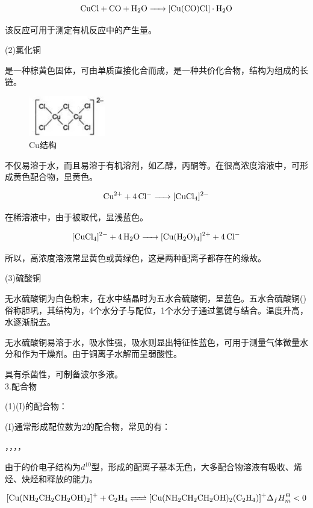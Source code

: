 \documentclass[a4paper,UTF8]{article}
\begin{document}
$$ \ce{CuCl + CO + H2O -> [Cu(CO)Cl]\cdot H2O} $$

该反应可用于测定有机反应中的产生量。

(2)氯化铜

是一种棕黄色固体，可由单质直接化合而成，是一种共价化合物，结构为组成的长链。

\begin{figure}[ht]
	\centering
	\includegraphics[width=0.3\textwidth]{figure//Cu结构.png}
	\caption{Cu结构}
	\label{fig:Cu结构}
\end{figure}

不仅易溶于水，而且易溶于有机溶剂，如乙醇，丙酮等。在很高浓度溶液中，可形成黄色配合物，显黄色。

$$ \ce{Cu^{2+} + 4Cl- -> [CuCl4]^{2-}} $$

在稀溶液中，由于被取代，显浅蓝色。

$$ \ce{[CuCl4]^{2-} + 4H2O -> [Cu(H2O)4]^{2+} + 4Cl-} $$

所以，高浓度溶液常显黄色或黄绿色，这是两种配离子都存在的缘故。

(3)硫酸铜

无水硫酸铜为白色粉末，在水中结晶时为五水合硫酸铜，呈蓝色。五水合硫酸铜()俗称胆巩，其结构为，4个水分子与配位，1个水分子通过氢键与结合。温度升高，水逐渐脱去。

无水硫酸铜易溶于水，吸水性强，吸水则显出特征性蓝色，可用于测量气体微量水分和作为干燥剂。由于铜离子水解而呈弱酸性。

具有杀菌性，可制备波尔多液。\\

3.配合物

(1)(I)的配合物：

(I)通常形成配位数为2的配合物，常见的有：

\ce{[Cu(SCN)2]+}，\ce{[CuCl2]-}，\ce{[Cu(NH3)2]+}，，\ce{[Cu(CN)2]-}

由于的价电子结构为$d^{10}$型，形成的配离子基本无色，大多配合物溶液有吸收、烯烃、炔烃和释放的能力。

$$ \ce{[Cu(NH2CH2CH2OH)2]+ + C2H4 <=> [Cu(NH2CH2CH2OH)2(C2H4)]+} \Delta _{f}H^{\Theta}_{m}<0$$
\end{document}
